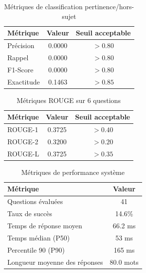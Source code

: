 
\begin{table}[h]
\centering
\caption{Métriques de classification pertinence/hors-sujet}
\label{tab:classification}
\begin{tabular}{lcc}
\hline
\textbf{Métrique} & \textbf{Valeur} & \textbf{Seuil acceptable} \\
\hline
Précision & 0.0000 & $> 0.80$ \\
Rappel & 0.0000 & $> 0.80$ \\
F1-Score & 0.0000 & $> 0.80$ \\
Exactitude & 0.1463 & $> 0.85$ \\
\hline
\end{tabular}
\end{table}

\begin{table}[h]
\centering
\caption{Métriques ROUGE sur 6 questions}
\label{tab:rouge}
\begin{tabular}{lcc}
\hline
\textbf{Métrique} & \textbf{Valeur} & \textbf{Seuil acceptable} \\
\hline
ROUGE-1 & 0.3725 & $> 0.40$ \\
ROUGE-2 & 0.3200 & $> 0.20$ \\
ROUGE-L & 0.3725 & $> 0.35$ \\
\hline
\end{tabular}
\end{table}

\begin{table}[h]
\centering
\caption{Métriques de performance système}
\label{tab:performance}
\begin{tabular}{lc}
\hline
\textbf{Métrique} & \textbf{Valeur} \\
\hline
Questions évaluées & 41 \\
Taux de succès & 14.6\% \\
Temps de réponse moyen & 66.2 ms \\
Temps médian (P50) & 53 ms \\
Percentile 90 (P90) & 165 ms \\
Longueur moyenne des réponses & 80.0 mots \\
\hline
\end{tabular}
\end{table}